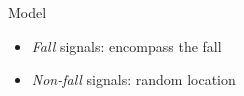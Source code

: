 \begin{frame}{Model}{}
\begin{minipage}[t]{0.52\linewidth}
    \begin{overlayarea}{\linewidth}{1.25cm}
    \small
    \centering
    \end{overlayarea}
    \begin{itemize}
        \item \textit{Fall} signals: encompass the fall
        \item \textit{Non-fall} signals: random location
    \end{itemize}


\end{minipage}



\end{frame}

